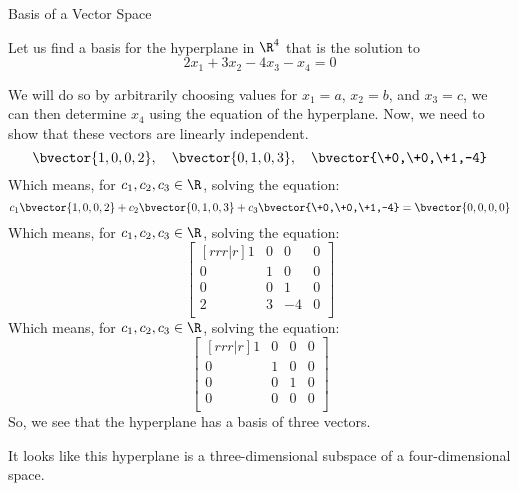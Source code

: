 \documentclass{beamer}
\begin{document}
\begin{frame}{Basis of a Vector Space}
\begin{example}
Let us find a basis for the hyperplane in $\R^4$ that is the solution to
\begin{equation*}
2x_1+3x_2-4x_3-x_4=0
\end{equation*}
\begin{overprint}
We will do so by arbitrarily choosing values for $x_1=a$, $x_2=b$, and $x_3=c$, we can then determine $x_4$ using the equation of the hyperplane.
Now, we need to show that these vectors are linearly independent.
\begin{equation*}
\bvector{1,0,0,2},\quad
\bvector{0,1,0,3},\quad
\bvector{\+0,\+0,\+1,-4} 
\end{equation*}
Which means, for $c_1,c_2,c_3\in\R$, solving the equation:
\begin{equation*}
c_1\bvector{1,0,0,2}+
c_2\bvector{0,1,0,3}+
c_3\bvector{\+0,\+0,\+1,-4}=
\bvector{0,0,0,0}
\end{equation*}
Which means, for $c_1,c_2,c_3\in\R$, solving the equation:
\begin{equation*}
\begin{bmatrix}[rrr|r]
1 & 0 & 0 & 0 \\
0 & 1 & 0 & 0 \\
0 & 0 & 1 & 0 \\
2 & 3 & -4 & 0 \\
\end{bmatrix}
\end{equation*}
Which means, for $c_1,c_2,c_3\in\R$, solving the equation:
\begin{equation*}
\begin{bmatrix}[rrr|r]
1 & 0 & 0 & 0 \\
0 & 1 & 0 & 0 \\
0 & 0 & 1 & 0 \\
0 & 0 & 0 & 0 \\
\end{bmatrix}
\end{equation*}
\vspace{1cm}
So, we see that the hyperplane has a basis of three vectors. 

\vspace{0.5cm}
It looks like this hyperplane is a three-dimensional subspace of a four-dimensional space.
\end{overprint}
\end{example}
\end{frame}
\end{document}
